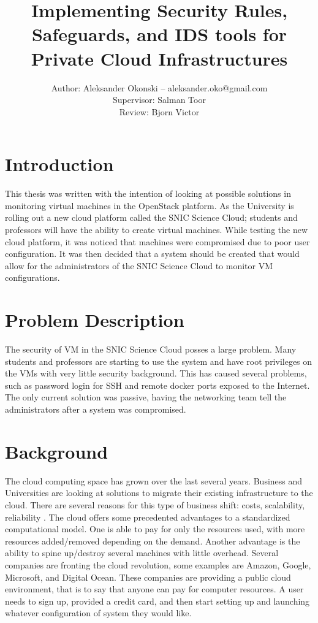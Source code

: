 \documentclass[12pt]{article}
\title{Implementing Security Rules, Safeguards, and IDS tools for Private Cloud Infrastructures}
\author{Author: Aleksander Okonski -- aleksander.oko@gmail.com \\ Supervisor: Salman Toor \\ Review: Bjorn Victor }
\date{}
\begin{document}
\maketitle
\newpage
\tableofcontents
\newpage

\section{Introduction}
This thesis was written with the intention of looking at possible solutions in monitoring virtual machines in the OpenStack platform. As the University is rolling out a new cloud platform called the SNIC Science Cloud; students and professors will have the ability to create virtual machines. While testing the new cloud platform, it was noticed that machines were compromised due to poor user configuration. It was then decided that a system should be created that would allow for the administrators of the SNIC Science Cloud to monitor VM configurations\@.

\section{Problem Description}
The security of VM in the SNIC Science Cloud posses a large problem. Many students and professors are starting to use the system and have root privileges on the VMs with very little security background. This has caused several problems, such as password login for SSH and remote docker ports exposed to the Internet. The only current solution was passive, having the networking team tell the administrators after a system was compromised.

\section{Background}
The cloud computing space has grown over the last several years. Business and Universities are looking at solutions to migrate their existing infrastructure to the cloud. There are several reasons for this type of business shift: costs, scalability, reliability \cite{DillonWuChang}. The cloud offers some precedented advantages to a standardized computational model. One is able to pay for only the resources used, with more resources added/removed depending on the demand. Another advantage is the ability to spine up/destroy several machines with little overhead. Several companies are fronting the cloud revolution, some examples are Amazon\cite{amazonaws2017}, Google\cite{GoogleCloudCompute2017}, Microsoft\cite{Azure2017}, and Digital Ocean\cite{DigitalOcian2017}. These companies are providing a public cloud environment, that is to say that anyone can pay for computer resources. A user needs to sign up, provided a credit card, and then start setting up and launching whatever configuration of system they would like.
\end{document}

